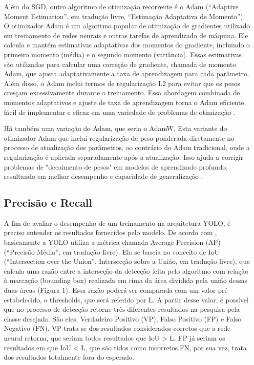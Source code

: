 Além do SGD, outro algoritmo de otimização recorrente é o Adam (“Adaptive Moment Estimation”, em tradução livre, “Estimação Adaptativa de Momento”). O otimizador Adam é um algoritmo popular de otimização de gradientes utilizado em treinamento de redes neurais e outras tarefas de aprendizado de máquina. Ele calcula e mantém estimativas adaptativas dos momentos do gradiente, incluindo o primeiro momento (média) e o segundo momento (variância). Essas estimativas são utilizadas para calcular uma correção de gradiente, chamada de momento Adam, que ajusta adaptativamente a taxa de aprendizagem para cada parâmetro. Além disso, o Adam inclui termos de regularização L2 para evitar que os pesos cresçam excessivamente durante o treinamento. Essa abordagem combinada de momentos adaptativos e ajuste de taxa de aprendizagem torna o Adam eficiente, fácil de implementar e eficaz em uma variedade de problemas de otimização \cite{kingma2014adam}.

Há também uma variação do Adam, que seria o AdamW. Esta variante do otimizador Adam que inclui regularização de peso ponderada diretamente no processo de atualização dos parâmetros, ao contrário do Adam tradicional, onde a regularização é aplicada separadamente após a atualização. Isso ajuda a corrigir problemas de "decaimento de pesos" em modelos de aprendizado profundo, resultando em melhor desempenho e capacidade de generalização \cite{zhou2024towards}.


\subsection{Precisão e Recall}
\label{sec:precisaorecall}

A fim de avaliar o desempenho de um treinamento na arquitetura YOLO, é preciso entender os resultados fornecidos pelo modelo. De acordo com \cite{padilla2020survey}, basicamente a YOLO utiliza a métrica chamada Average Precision (AP) (“Precisão Média”, em tradução livre). Ela se baseia no conceito de IoU (“Intersection over the Union”, Intersecção sobre a União, em tradução livre), que calcula uma razão entre a interseção da detecção feita pelo algoritmo com relação à marcação (bounding box) realizada em cima da área dividida pela união dessas duas áreas (Figura 1). Essa razão poderá ser comparada com um valor pré-estabelecido, o thresholds, que será referido por L. A partir desse valor, é possível que no processo de detecção retorne três diferentes resultados na pesquisa pela classe desejada. São eles: Verdadeiro Positivo (VP), Falso Positivo (FP) e Falso Negativo (FN). VP trata-se dos resultados considerados corretos que a rede neural retorna, que seriam todos resultados que IoU > L. FP já seriam os resultados em que IoU < L, que são tidos como incorretos.FN, por sua vez, trata dos resultados totalmente fora do esperado.

